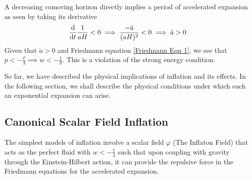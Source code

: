 \documentclass[aps,prd,reprint,preprintnumbers,showpacs,floatfix,nofootinbib,superscript address]{revtex4-2}
\begin{document}
A decreasing comoving horizon directly implies a period of accelerated expansion as seen by taking its derivative
\begin{equation}
    \frac{\mathrm{d}}{\mathrm{d}t} \frac{1}{aH} <  0 \implies \frac{-\Ddot{a}}{(aH)^2} < 0 \implies \ddot{a} > 0
\end{equation}
Given that $\ddot{a} > 0$ and Friedmann equation \ref{Friedmann Eqn 1}, we see that $p < -\frac{\rho}{3} \implies w < - \frac{1}{3}$. This is a violation of the strong energy condition.

So far, we have described the physical implications of inflation and its effects. In the following section, we shall describe the physical conditions under which such an exponential expansion can arise. 

\subsection{Canonical Scalar Field Inflation} \label{Canonical Scalar Field Inflation}
The simplest models of inflation involve a scalar field $\varphi$ (The Inflaton Field) that acts as the perfect fluid with $w < -\frac{1}{3}$ such that upon coupling with gravity through the Einstein-Hilbert action, it can provide the repulsive force in the Friedmann equations for the accelerated expansion.
\end{document}
